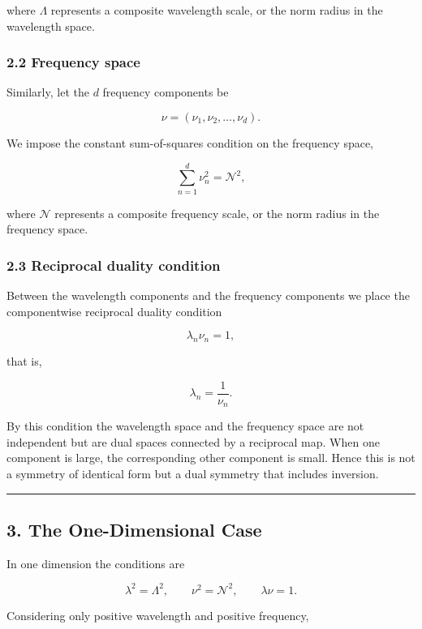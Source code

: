 \documentclass[
]{article}
\begin{document}
where \(\Lambda\) represents a composite wavelength scale, or the norm
radius in the wavelength space.

\subsubsection{2.2 Frequency space}\label{frequency-space}

Similarly, let the \(d\) frequency components be

\[
\nu=(\nu_1,\nu_2,\ldots,\nu_d) .
\]

We impose the constant sum-of-squares condition on the frequency space,

\[
\sum_{n=1}^{d} \nu_n^2=\mathcal{N}^2 ,
\]

where \(\mathcal{N}\) represents a composite frequency scale, or the
norm radius in the frequency space.

\subsubsection{2.3 Reciprocal duality
condition}\label{reciprocal-duality-condition}

Between the wavelength components and the frequency components we place
the componentwise reciprocal duality condition

\[
\lambda_n\nu_n=1 ,
\]

that is,

\[
\lambda_n=\frac{1}{\nu_n} .
\]

By this condition the wavelength space and the frequency space are not
independent but are dual spaces connected by a reciprocal map. When one
component is large, the corresponding other component is small. Hence
this is not a symmetry of identical form but a dual symmetry that
includes inversion.

\begin{center}\rule{0.5\linewidth}{0.5pt}\end{center}

\subsection{3. The One-Dimensional Case}\label{the-one-dimensional-case}

In one dimension the conditions are

\[
\lambda^2=\Lambda^2,\qquad
\nu^2=\mathcal{N}^2,\qquad
\lambda\nu=1 .
\]

Considering only positive wavelength and positive frequency,
\end{document}
